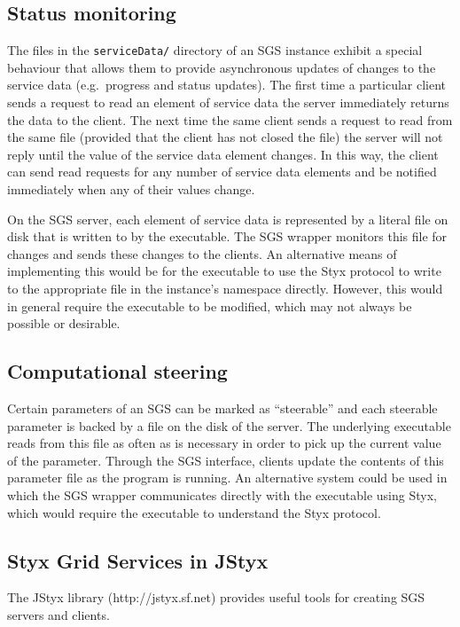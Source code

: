 \documentclass[a4paper]{article}
\begin{document}
\begin{multicols}{2}
\subsection{Status monitoring} \label{sec:sgsstatus}
The files in the \texttt{serviceData/} directory of an SGS instance exhibit a special behaviour that allows them to provide asynchronous updates of changes to the service data (e.g.\ progress and status updates).  The first time a particular client sends a request to read an element of service data the server immediately returns the data to the client.  The next time the same client sends a request to read from the same file (provided that the client has not closed the file) the server will not reply until the value of the service data element changes.  In this way, the client can send read requests for any number of service data elements and be notified immediately when any of their values change.

On the SGS server, each element of service data is represented by a literal file on disk that is written to by the executable.  The SGS wrapper monitors this file for changes and sends these changes to the clients.  An alternative means of implementing this would be for the executable to use the Styx protocol to write to the appropriate file in the instance's namespace directly.  However, this would in general require the executable to be modified, which may not always be possible or desirable.

\subsection{Computational steering} \label{sec:steering}
Certain parameters of an SGS can be marked as ``steerable'' and each steerable parameter is backed by a file on the disk of the server.  The underlying executable reads from this file as often as is necessary in order to pick up the current value of the parameter.  Through the SGS interface, clients update the contents of this parameter file as the program is running.
An alternative system could be used in which the SGS wrapper communicates directly with the executable using Styx, which would require the executable to understand the Styx protocol.

\subsection{Styx Grid Services in JStyx}
The JStyx library (http://jstyx.sf.net) provides useful tools for creating SGS servers and clients.


\end{multicols}
\end{document}
